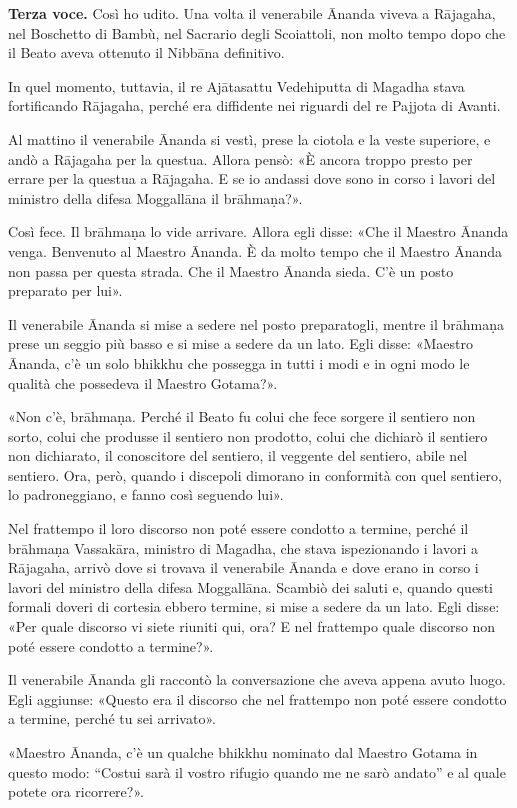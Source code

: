 \textbf{Terza voce.} Così ho udito. Una volta il venerabile Ānanda viveva a
Rājagaha, nel Boschetto di Bambù, nel Sacrario degli Scoiattoli, non
molto tempo dopo che il Beato aveva ottenuto il Nibbāna definitivo.


In quel momento, tuttavia, il re Ajātasattu Vedehiputta di Magadha stava
fortificando Rājagaha, perché era diffidente nei riguardi del re Pajjota
di Avanti.


Al mattino il venerabile Ānanda si vestì, prese la ciotola e la veste
superiore, e andò a Rājagaha per la questua. Allora pensò: «È ancora
troppo presto per errare per la questua a Rājagaha. E se io andassi dove
sono in corso i lavori del ministro della difesa Moggallāna il
brāhmaṇa?».


Così fece. Il brāhmaṇa lo vide arrivare. Allora egli disse: «Che il
Maestro Ānanda venga. Benvenuto al Maestro Ānanda. È da molto tempo che
il Maestro Ānanda non passa per questa strada. Che il Maestro Ānanda
sieda. C’è un posto preparato per lui».


Il venerabile Ānanda si mise a sedere nel posto preparatogli, mentre il
brāhmaṇa prese un seggio più basso e si mise a sedere da un lato. Egli
disse: «Maestro Ānanda, c’è un solo bhikkhu che possegga in tutti i modi
e in ogni modo le qualità che possedeva il Maestro Gotama?».


«Non c’è, brāhmaṇa. Perché il Beato fu colui che fece sorgere il
sentiero non sorto, colui che produsse il sentiero non prodotto, colui
che dichiarò il sentiero non dichiarato, il conoscitore del sentiero, il
veggente del sentiero, abile nel sentiero. Ora, però, quando i discepoli
dimorano in conformità con quel sentiero, lo padroneggiano, e fanno così
seguendo lui».


Nel frattempo il loro discorso non poté essere condotto a termine,
perché il brāhmaṇa Vassakāra, ministro di Magadha, che stava
ispezionando i lavori a Rājagaha, arrivò dove si trovava il venerabile
Ānanda e dove erano in corso i lavori del ministro della difesa
Moggallāna. Scambiò dei saluti e, quando questi formali doveri di
cortesia ebbero termine, si mise a sedere da un lato. Egli disse: «Per
quale discorso vi siete riuniti qui, ora? E nel frattempo quale discorso
non poté essere condotto a termine?».


Il venerabile Ānanda gli raccontò la conversazione che aveva appena
avuto luogo. Egli aggiunse: «Questo era il discorso che nel frattempo
non poté essere condotto a termine, perché tu sei arrivato».


«Maestro Ānanda, c’è un qualche bhikkhu nominato dal Maestro Gotama in
questo modo: “Costui sarà il vostro rifugio quando me ne sarò andato” e
al quale potete ora ricorrere?».


